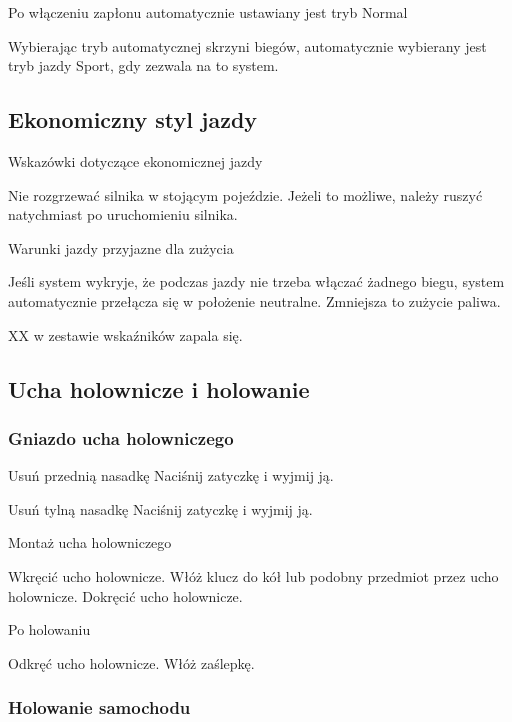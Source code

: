 Po włączeniu zapłonu automatycznie ustawiany jest tryb Normal

Wybierając tryb \gearS automatycznej skrzyni biegów, automatycznie wybierany jest tryb jazdy Sport, gdy zezwala na to system.


\subsection{Ekonomiczny styl jazdy}

Wskazówki dotyczące ekonomicznej jazdy

\begin{itemizeTriangle}
	\itemTriangle Nie rozgrzewać silnika w stojącym pojeździe. Jeżeli to możliwe, należy ruszyć natychmiast po uruchomieniu silnika.
\end{itemizeTriangle}

Warunki jazdy przyjazne dla zużycia

Jeśli system wykryje, że podczas jazdy nie trzeba włączać żadnego biegu, system automatycznie przełącza się w położenie neutralne. Zmniejsza to zużycie paliwa.

XX w zestawie wskaźników zapala się.

\subsection{Ucha holownicze i holowanie}

\subsubsection{Gniazdo ucha holowniczego}

Usuń przednią nasadkę
Naciśnij zatyczkę i wyjmij ją.

Usuń tylną nasadkę
Naciśnij zatyczkę i wyjmij ją.

Montaż ucha holowniczego
\begin{itemizeArrow}
	\itemArrow Wkręcić ucho holownicze.
	\itemArrow Włóż klucz do kół lub podobny przedmiot przez ucho holownicze.
	\itemArrow Dokręcić ucho holownicze.
\end{itemizeArrow}

Po holowaniu
\begin{itemizeArrow}
	\itemArrow Odkręć ucho holownicze.
	\itemArrow Włóż zaślepkę.
\end{itemizeArrow}

\subsubsection{Holowanie samochodu}

